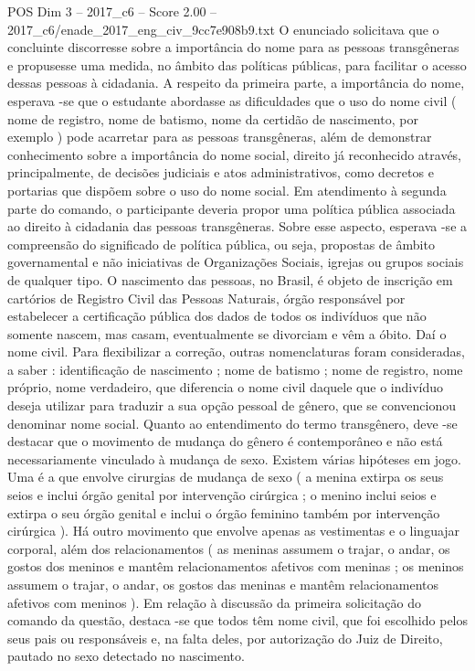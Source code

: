 \begin{textsample}{POS Dim 3 – 2017\_c6 – Score 2.00 – 2017\_c6/enade\_2017\_eng\_civ\_9cc7e908b9.txt}
O enunciado solicitava que o concluinte discorresse sobre a importância do nome para as pessoas transgêneras e propusesse uma medida, no âmbito das políticas públicas, para facilitar o acesso dessas pessoas à cidadania.
A respeito da primeira parte, a importância do nome, esperava -se que o estudante abordasse as dificuldades que o uso do nome civil ( nome de registro, nome de batismo, nome da certidão de nascimento, por exemplo ) pode acarretar para as pessoas transgêneras, além de demonstrar conhecimento sobre a importância do nome social, direito já reconhecido através, principalmente, de decisões judiciais e atos administrativos, como decretos e portarias que dispõem sobre o uso do nome social.
Em atendimento à segunda parte do comando, o participante deveria propor uma política pública associada ao direito à cidadania das pessoas transgêneras.
Sobre esse aspecto, esperava -se a compreensão do significado de política pública, ou seja, propostas de âmbito governamental e não iniciativas de Organizações Sociais, igrejas ou grupos sociais de qualquer tipo.
O nascimento das pessoas, no Brasil, é objeto de inscrição em cartórios de Registro Civil das Pessoas Naturais, órgão responsável por estabelecer a certificação pública dos dados de todos os indivíduos que não somente nascem, mas casam, eventualmente se divorciam e vêm a óbito.
Daí o nome civil.
Para flexibilizar a correção, outras nomenclaturas foram consideradas, a saber : identificação de nascimento ; nome de batismo ; nome de registro, nome próprio, nome verdadeiro, que diferencia o nome civil daquele que o indivíduo deseja utilizar para traduzir a sua opção pessoal de gênero, que se convencionou denominar nome social.
Quanto ao entendimento do termo transgênero, deve -se destacar que o movimento de mudança do gênero é contemporâneo e não está necessariamente vinculado à mudança de sexo.
Existem várias hipóteses em jogo.
Uma é a que envolve cirurgias de mudança de sexo ( a menina extirpa os seus seios e inclui órgão genital por intervenção cirúrgica ; o menino inclui seios e extirpa o seu órgão genital e inclui o órgão feminino também por intervenção cirúrgica ).
Há outro movimento que envolve apenas as vestimentas e o linguajar corporal, além dos relacionamentos ( as meninas assumem o trajar, o andar, os gostos dos meninos e mantêm relacionamentos afetivos com meninas ; os meninos assumem o trajar, o andar, os gostos das meninas e mantêm relacionamentos afetivos com meninos ).
Em relação à discussão da primeira solicitação do comando da questão, destaca -se que todos têm nome civil, que foi escolhido pelos seus pais ou responsáveis e, na falta deles, por autorização do Juiz de Direito, pautado no sexo detectado no nascimento.

\end{textsample}
